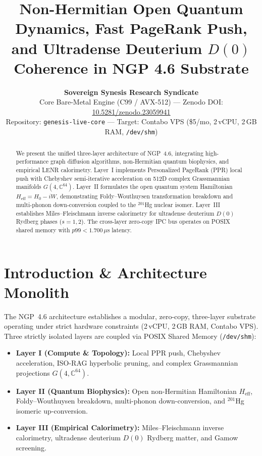 \documentclass[10pt,twocolumn]{article}
\title{\textbf{Non-Hermitian Open Quantum Dynamics, Fast PageRank Push,\\
and Ultradense Deuterium $D(0)$ Coherence in NGP 4.6 Substrate}}
\author{\textbf{Sovereign Synesis Research Syndicate}\\
\small Core Bare-Metal Engine (C99 / AVX-512) ---
Zenodo DOI: \href{https://doi.org/10.5281/zenodo.23059941}{10.5281/zenodo.23059941}\\
\small Repository: \texttt{genesis-live-core} ---
Target: Contabo VPS (\$5/mo, 2\,vCPU, 2\,GB RAM, \texttt{/dev/shm})}
\date{}
\begin{document}
\maketitle

\begin{abstract}
We present the unified three-layer architecture of NGP~4.6, integrating
high-performance graph diffusion algorithms, non-Hermitian quantum biophysics,
and empirical LENR calorimetry. Layer~I implements Personalized PageRank (PPR)
local push with Chebyshev semi-iterative acceleration on 512D complex
Grassmannian manifolds $G(4,\mathbb{C}^{64})$. Layer~II formulates the open
quantum system Hamiltonian $H_{\mathrm{eff}}=H_0-iW$, demonstrating
Foldy--Wouthuysen transformation breakdown and multi-phonon down-conversion
coupled to the $^{201}$Hg nuclear isomer. Layer~III establishes
Miles--Fleischmann inverse calorimetry for ultradense deuterium $D(0)$ Rydberg
phases ($s=1,2$). The cross-layer zero-copy IPC bus operates on POSIX shared
memory with $p99<1.700\,\mu$s latency.
\end{abstract}

\section{Introduction \& Architecture Monolith}
The NGP~4.6 architecture establishes a modular, zero-copy, three-layer substrate
operating under strict hardware constraints (2\,vCPU, 2\,GB RAM, Contabo VPS).
Three strictly isolated layers are coupled via POSIX Shared Memory
(\texttt{/dev/shm}):
\begin{itemize}
  \item \textbf{Layer I (Compute \& Topology):} Local PPR push, Chebyshev
        acceleration, ISO-RAG hyperbolic pruning, and complex Grassmannian
        projections $G(4,\mathbb{C}^{64})$.
  \item \textbf{Layer II (Quantum Biophysics):} Open non-Hermitian Hamiltonian
        $H_{\mathrm{eff}}$, Foldy--Wouthuysen breakdown, multi-phonon
        down-conversion, and $^{201}$Hg isomeric up-conversion.
  \item \textbf{Layer III (Empirical Calorimetry):} Miles--Fleischmann inverse
        calorimetry, ultradense deuterium $D(0)$ Rydberg matter, and Gamow
        screening.
\end{itemize}
\end{document}
